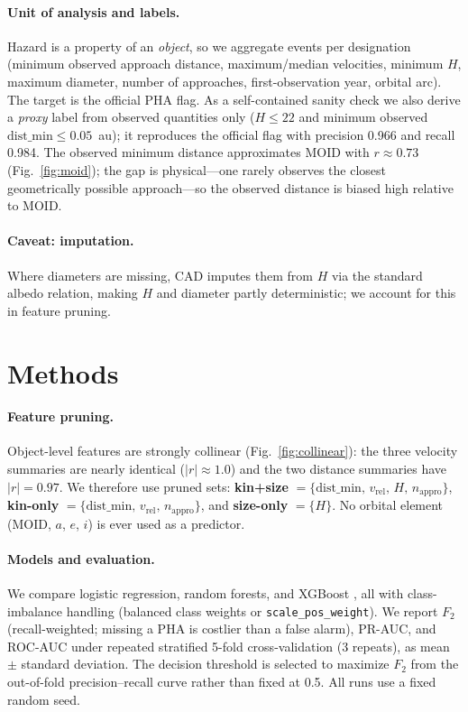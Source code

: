 \documentclass[11pt]{article}
\begin{document}
\paragraph{Unit of analysis and labels.}
Hazard is a property of an \emph{object}, so we aggregate events per designation
(minimum observed approach distance, maximum/median velocities, minimum $H$, maximum
diameter, number of approaches, first-observation year, orbital arc). The target is
the official PHA flag. As a self-contained sanity check we also derive a
\emph{proxy} label from observed quantities only ($H\le 22$ and minimum observed
$\mathrm{dist\_min}\le 0.05$~au); it reproduces the official flag with precision
0.966 and recall 0.984. The observed minimum distance approximates MOID with
$r\approx0.73$ (Fig.~\ref{fig:moid}); the gap is physical---one rarely observes the
closest geometrically possible approach---so the observed distance is biased high
relative to MOID.

\paragraph{Caveat: imputation.}
Where diameters are missing, CAD imputes them from $H$ via the standard albedo
relation, making $H$ and diameter partly deterministic; we account for this in
feature pruning.

\section{Methods}
\paragraph{Feature pruning.}
Object-level features are strongly collinear (Fig.~\ref{fig:collinear}): the three
velocity summaries are nearly identical ($|r|\approx1.0$) and the two distance
summaries have $|r|=0.97$. We therefore use pruned sets: \textbf{kin+size}
$=\{\mathrm{dist\_min},\, v_\mathrm{rel},\, H,\, n_\mathrm{appro}\}$, \textbf{kin-only}
$=\{\mathrm{dist\_min},\, v_\mathrm{rel},\, n_\mathrm{appro}\}$, and \textbf{size-only}
$=\{H\}$. No orbital element (MOID, $a$, $e$, $i$) is ever used as a predictor.

\paragraph{Models and evaluation.}
We compare logistic regression, random forests, and XGBoost \citep{xgboost,scikit-learn},
all with class-imbalance handling (balanced class weights or
\texttt{scale\_pos\_weight}). We report $F_2$ (recall-weighted; missing a PHA is
costlier than a false alarm), PR-AUC, and ROC-AUC under repeated stratified
5-fold cross-validation (3 repeats), as mean $\pm$ standard deviation. The decision
threshold is selected to maximize $F_2$ from the out-of-fold precision--recall curve
rather than fixed at 0.5. All runs use a fixed random seed.
\end{document}
